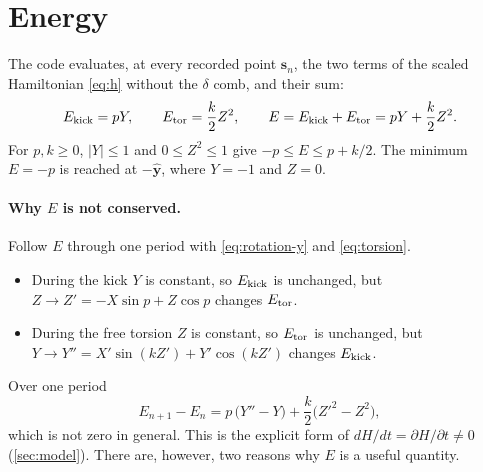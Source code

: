 \documentclass[11pt,a4paper]{article}
\newcommand{\vs}{\bm{s}}
\begin{document}
\section{Energy}\label{sec:energy}

The code evaluates, at every recorded point $\vs_n$, the two terms of the scaled Hamiltonian \eqref{eq:h} without the
$\delta$ comb, and their sum:
\begin{equation}\label{eq:energy}
  E_{\rm kick} = pY, \qquad E_{\rm tor} = \frac{k}{2}Z^2, \qquad E = E_{\rm kick} + E_{\rm tor} = pY + \frac{k}{2}Z^2 .
\end{equation}
For $p, k \ge 0$, $|Y|\le1$ and $0\le Z^2\le1$ give $-p \le E \le p + k/2$. The minimum $E = -p$ is reached at
$-\hat{\bm y}$, where $Y=-1$ and $Z=0$.

\paragraph{Why $E$ is not conserved.} Follow $E$ through one period with \eqref{eq:rotation-y} and \eqref{eq:torsion}.
\begin{itemize}
  \item During the kick $Y$ is constant, so $E_{\rm kick}$ is unchanged, but $Z \to Z' = -X\sin p + Z\cos p$
  changes $E_{\rm tor}$.
  \item During the free torsion $Z$ is constant, so $E_{\rm tor}$ is unchanged, but $Y \to Y'' = X'\sin(kZ') +
  Y'\cos(kZ')$ changes $E_{\rm kick}$.
\end{itemize}
Over one period
\begin{equation*}
  E_{n+1} - E_n = p\,\big(Y'' - Y\big) + \frac k2\big(Z'^2 - Z^2\big),
\end{equation*}
which is not zero in general. This is the explicit form of $dH/dt = \partial H/\partial t \ne 0$
(\cref{sec:model}). There are, however, two reasons why $E$ is a useful quantity.
\end{document}
